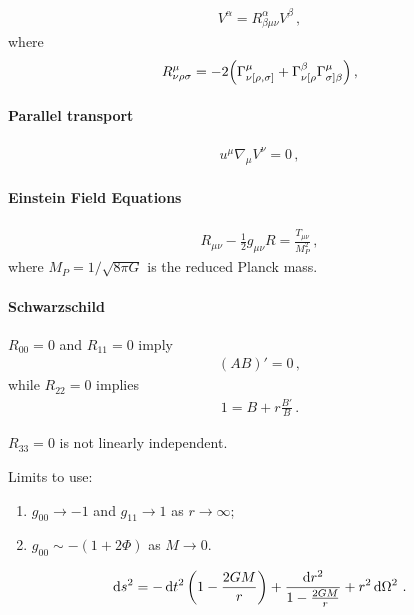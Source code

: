 \documentclass[main.tex]{subfiles}
\begin{document}
%
\begin{align}
[\nabla_{\mu }, \nabla_{\nu } ] V^{\alpha } = R_{\beta \mu \nu }^{\alpha } V^{\beta }
\,,
\end{align}
%
where 
%
\begin{align}
R_{\nu \rho \sigma }^{\mu } = -2 \qty(\Gamma^{\mu }_{\nu [\rho , \sigma ]}  + \Gamma^{\beta }_{\nu [\rho } \Gamma^{\mu }_{\sigma ] \beta })
\,,
\end{align}

\paragraph{Parallel transport}

\begin{align}
u^{\mu } \nabla_{\mu } V^{\nu } =0
\,,
\end{align}

\paragraph{Einstein Field Equations}

%
\begin{align}
R_{\mu \nu } - \frac{1}{2} g_{\mu \nu } R = \frac{T_{\mu \nu } }{M_P^2}
\,,
\end{align}
%
where 
\(M_P = 1 / \sqrt{8 \pi G}\) is the reduced Planck mass.

\paragraph{Schwarzschild}

\(R_{00} =0\) and \(R_{11} =0 \) imply 
%
\begin{align}
(AB)' = 0
\,,
\end{align}
%
while \(R_{22} =0\) implies 
%
\begin{align}
1 = B + r \frac{B'}{B}
\,.
\end{align}

\(R_{33} =0\) is not linearly independent.  

Limits to use: 
\begin{enumerate}
  \item \(g_{00} \rightarrow -1\) and \(g_{11} \rightarrow 1\) as \(r \rightarrow \infty \);
  \item \(g_{00} \sim -(1 + 2 \Phi )\) as \(M \rightarrow 0\).
\end{enumerate}


\begin{align}
\dd{s^2} = - \dd{t^2} \qty(1 - \frac{2GM}{r})
+ \frac{ \dd{r^2}}{1 - \frac{2GM}{r}} + r^2 \dd{\Omega^2}
\,.
\end{align}
%
\end{document}
